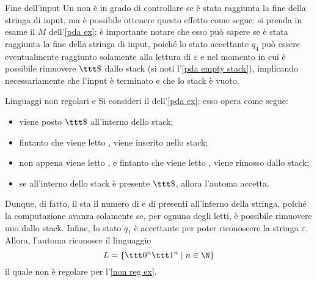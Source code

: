 \documentclass[a4paper, 12pt]{report}
\begin{document}
    \begin{framedobs}{Fine dell'input}
        Un \PDA non è in grado di controllare se è stata raggiunta la fine della stringa di input, ma è possibile ottenere questo effetto come segue: si prenda in esame il \PDA $M$ dell'\cref{pda ex}; è importante notare che esso può sapere se è stata raggiunta la fine della stringa di input, poiché lo stato accettante $q_4$ può essere eventualmente raggiunto solamente alla lettura di $\varepsilon$ e nel momento in cui è possibile rimuovere $\ttt \$$ dallo stack (si noti l'\cref{pda empty stack}), implicando necessariamente che l'input è terminato e che lo stack è vuoto.
    \end{framedobs}

    \begin{framedobs}{Linguaggi non regolari e \PDA}
        Si consideri il \PDA dell'\cref{pda ex}; esso opera come segue:

        \begin{itemize}
            \item viene posto $\ttt \$$ all'interno dello stack;
            \item fintanto che viene letto , viene inserito  nello stack;
            \item non appena viene letto , e fintanto che viene letto , viene rimosso  dallo stack;
            \item se all'interno dello stack è presente $\ttt \$$, allora l'automa accetta.
        \end{itemize}

        Dunque, di fatto, il \PDA sta  il numero di  e di  presenti all'interno della stringa, poiché la computazione avanza solamente se, per ognuno degli  letti, è possibile rimuovere uno  dallo stack. Infine, lo stato $q_1$ è accettante per poter riconoscere la stringa $\varepsilon$. Allora, l'automa riconosce il linguaggio $$L = \{\ttt 0 ^n \ttt 1 ^n \mid n \in \N\}$$ il quale non è regolare per l'\cref{non reg ex}.
    \end{framedobs}
\end{document}
